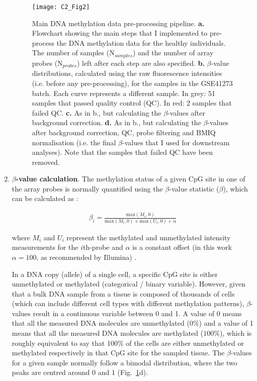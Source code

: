 \begin{enumerate}
	
	\begin{figure}[htbp!] 
		\centering    
		\texttt{[image: C2\_Fig2]}
		\vspace*{2mm}
		\caption[Main DNA methylation data pre-processing pipeline]{Main DNA methylation data pre-processing pipeline. \textbf{a.} Flowchart showing the main steps that I implemented to pre-process the DNA methylation data for the healthy individuals. The number of samples (N$_{samples}$) and the number of array probes (N$_{probes}$) left after each step are also specified. \textbf{b.}  $\beta$-value distributions, calculated using the raw fluorescence intensities (i.e. before any pre-processing), for the samples in the GSE41273 batch. Each curve represents a different sample. In grey: 51 samples that passed quality control (QC). In red: 2 samples that failed QC.  \textbf{c.} As in b., but calculating the $\beta$-values after background correction. \textbf{d.} As in b., but calculating the $\beta$-values after background correction, QC, probe filtering and BMIQ normalisation (i.e. the final $\beta$-values that I used for downstream analyses). Note that the samples that failed QC have been removed.}
		\label{fig:c2_fig2}
	\end{figure}
	
	
	\item \textbf{$\beta$-value calculation}. The methylation status of a given CpG site in one of the array probes is normally quantified using the $\beta$-value statistic ($\beta$), which can be calculated as \cite{Wilhelm-Benartzi2013,Du2010}:
	
	\begin{align}
	\beta_i = \frac{\text{max}(M_i,0)}{\text{max}(M_i,0) + \text{max}(U_i,0) + \alpha}
	\end{align}
	
	where $M_i$ and $U_i$ represent the methylated and unmethylated intensity measurements for the $i$th-probe and $\alpha$ is a constant offset (in this work $\alpha = 100$, as recommended by Illumina) \cite{Du2010}. 
	
	In a DNA copy (allele) of a single cell, a specific CpG site is either unmethylated or methylated (categorical / binary variable). However, given that a bulk DNA sample from a tissue is composed of thousands of cells (which can include different cell types with different methylation patterns), $\beta$-values result in a continuous variable between 0 and 1. A value of 0 means that all the measured DNA molecules are unmethylated ($0\%$) and a value of 1 means that all the measured DNA molecules are methylated ($100\%$), which is roughly equivalent to say that 100\% of the cells are either unmethylated or methylated respectively in that CpG site for the sampled tissue. The $\beta$-values for a given sample normally follow a bimodal distribution, where the two peaks are centred around 0 and 1 (Fig.~\ref{fig:c2_fig2}d). 
	

\end{enumerate}
